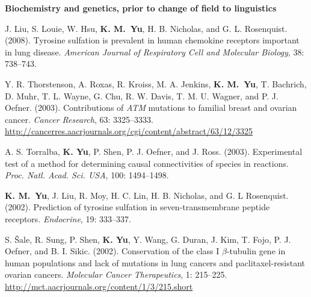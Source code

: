 \documentclass[10pt]{article}
\newcommand{\blankline}{\quad\pagebreak[3]}
\newcommand{\halfblankline}{\quad\vspace{-0.5\baselineskip}\pagebreak[3]}
\begin{document}
\blankline

\blankline

\textbf{Biochemistry and genetics, prior to change of field to linguistics} \hfill 

\halfblankline

\begin{bibenum}
    \item  J. Liu, S. Louie, W. Hsu, \textbf{K. M.~Yu},
      H. B. Nicholas, and G. L. Rosenquist. (2008). Tyrosine
        sulfation is prevalent in human chemokine receptors important
        in lung disease. \emph{American Journal of Respiratory Cell and Molecular Biology}, 38:
      738--743.  

      \item Y. R. Thorstenson, A. Roxas, R. Kroiss, M. A. Jenkins,
        \textbf{K. M.~Yu}, T. Bachrich, D.  Muhr, T. L. Wayne, G. Chu,
        R. W. Davis, T. M. U. Wagner, and P. J. Oefner. (2003). 
        Contributions of \textit{ATM} mutations to familial breast and
        ovarian cancer. \emph{Cancer Research}, 63:
        3325--3333. \url{http://cancerres.aacrjournals.org/cgi/content/abstract/63/12/3325}  

    \item A. S. Torralba, \textbf{K. Yu}, P. Shen, P. J. Oefner, and
      J. Ross. (2003). Experimental
        test of a method for determining causal connectivities of
        species in reactions. \textit{Proc. Natl. Acad. Sci. USA},
      100: 1494--1498. 

    \item \textbf{K. M.~Yu}, J. Liu, R. Moy, H. C. Lin,
      H. B. Nicholas, and G. L Rosenquist. (2002). Prediction of
      tyrosine sulfation in seven-transmembrane peptide receptors.
    \emph{Endocrine}, 19: 333--337.  

    \item S. \v{S}ale, R. Sung, P. Shen, \textbf{K. Yu}, Y. Wang,
      G. Duran, J. Kim, T. Fojo, P. J. Oefner, and
      B. I. Sikic. (2002). Conservation
        of the class I $\beta$-tubulin gene in human populations and
        lack of mutations in lung cancers and paclitaxel-resistant
        ovarian cancers. \emph{Molecular Cancer Therapeutics}, 1:
        215--225. \url{http://mct.aacrjournals.org/content/1/3/215.short} 

\end{bibenum}

\vspace{0.1in}
\end{document}
